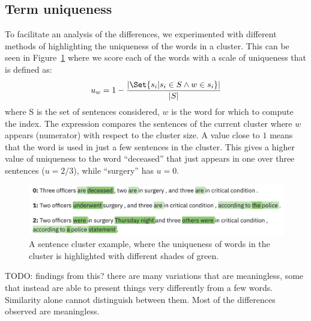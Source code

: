 \subsection{Term uniqueness}
To facilitate an analysis of the differences, we experimented with different methods of highlighting the uniqueness of the words in a cluster.
This can be seen in Figure~\ref{fig:words_uniqueness} where we score each of the words with a scale of uniqueness that is defined as:
$$u_w = 1 - \frac{|\Set{s_i | s_i \in S \land w \in s_i}|}{|S|}$$
where S is the set of sentences considered, $w$ is the word for which to compute the index. The expression compares the sentences of the current cluster where $w$ appears (numerator) with respect to the cluster size.
A value close to $1$ means that the word is used in just a few sentences in the cluster.
This gives a higher value of uniqueness to the word ``deceased'' that just appears in one over three sentences ($u = 2/3$), while ``surgery'' has $u = 0$.

\begin{figure}[!htb]
    \centering
    \includegraphics[width=\textwidth]{figures/words_uniqueness.png}
    \caption{A sentence cluster example, where the uniqueness of words in the cluster is highlighted with different shades of green.}
    \label{fig:words_uniqueness}
\end{figure}


TODO: findings from this?
there are many variations that are meaningless, some that instead are able to present things very differently from a few words. Similarity alone cannot distinguish between them.
Most of the differences observed are meaningless.




